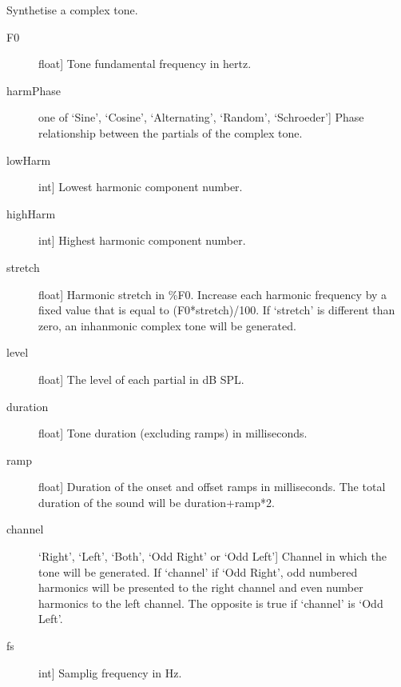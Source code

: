 \documentclass[letterpaper,10pt,english]{sphinxmanual}
\begin{document}

\begin{fulllineitems}
\label{index:sndlib.complexTone}
Synthetise a complex tone.
\begin{description}
\item[{F0}] \leavevmode{[}float{]}
Tone fundamental frequency in hertz.

\item[{harmPhase}] \leavevmode{[}one of `Sine', `Cosine', `Alternating', `Random', `Schroeder'{]}
Phase relationship between the partials of the complex tone.

\item[{lowHarm}] \leavevmode{[}int{]}
Lowest harmonic component number.

\item[{highHarm}] \leavevmode{[}int{]}
Highest harmonic component number.

\item[{stretch}] \leavevmode{[}float{]}
Harmonic stretch in \%F0. Increase each harmonic frequency by a fixed value
that is equal to (F0*stretch)/100. If `stretch' is different than
zero, an inhanmonic complex tone will be generated.

\item[{level}] \leavevmode{[}float{]}
The level of each partial in dB SPL.

\item[{duration}] \leavevmode{[}float{]}
Tone duration (excluding ramps) in milliseconds.

\item[{ramp}] \leavevmode{[}float{]}
Duration of the onset and offset ramps in milliseconds.
The total duration of the sound will be duration+ramp*2.

\item[{channel}] \leavevmode{[}`Right', `Left', `Both', `Odd Right' or `Odd Left'{]}
Channel in which the tone will be generated. If `channel'
if `Odd Right', odd numbered harmonics will be presented
to the right channel and even number harmonics to the left
channel. The opposite is true if `channel' is `Odd Left'.

\item[{fs}] \leavevmode{[}int{]}
Samplig frequency in Hz.


\end{description}
\end{fulllineitems}
\end{document}
